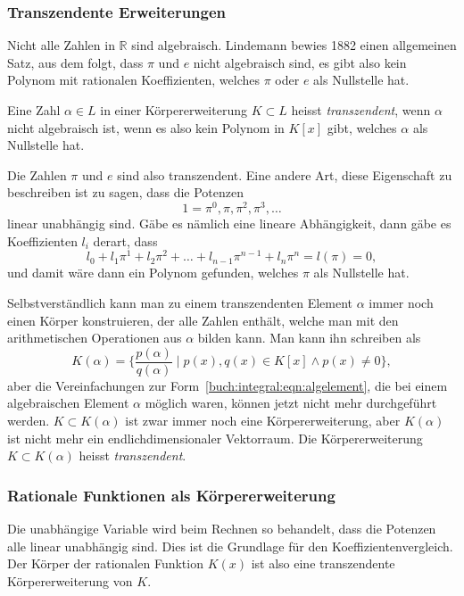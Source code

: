 %
%
\subsubsection{Transzendente Erweiterungen}
Nicht alle Zahlen in $\mathbb{R}$ sind algebraisch.
Lindemann bewies 1882 einen allgemeinen Satz, aus dem folgt,
%
dass $\pi$ und $e$ nicht algebraisch sind, es gibt also
kein Polynom mit rationalen Koeffizienten, welches $\pi$
oder $e$ als Nullstelle hat.
%
%

\begin{definition}
Eine Zahl $\alpha\in L$ in einer Körpererweiterung $K\subset L$ 
heisst {\em transzendent}, wenn $\alpha$ nicht algebraisch ist,
%
wenn es also kein Polynom in $K[x]$ gibt, welches $\alpha$ als
Nullstelle hat.
\end{definition}

Die Zahlen $\pi$ und $e$ sind also transzendent.
Eine andere Art, diese Eigenschaft zu beschreiben ist zu sagen,
dass die Potenzen
\[
1=\pi^0, \pi, \pi^2,\pi^3,\dots
\]
linear unabhängig sind.
Gäbe es nämlich eine lineare Abhängigkeit, dann gäbe es Koeffizienten
$l_i$ derart, dass
\[
l_0 + l_1\pi^1 + l_2\pi^2 + \ldots + l_{n-1}\pi^{n-1} + l_{n}\pi^n = l(\pi)=0,
\]
und damit wäre dann ein Polynom gefunden, welches $\pi$ als Nullstelle hat.

Selbstverständlich kann man zu einem transzendenten Element $\alpha$
immer noch einen Körper konstruieren, der alle Zahlen enthält, welche man
mit den arithmetischen Operationen aus $\alpha$ bilden kann.
Man kann ihn schreiben als
\[
K(\alpha)
=
\biggl\{
\frac{p(\alpha)}{q(\alpha)}
\;\bigg|\;
p(x),q(x)\in K[x] \wedge p(x)\ne 0
\biggr\},
\]
aber die Vereinfachungen zur
Form~\eqref{buch:integral:eqn:algelement}, die bei einem algebraischen
Element $\alpha$ möglich waren, können jetzt nicht mehr durchgeführt
werden.
$K\subset K(\alpha)$ ist zwar immer noch eine Körpererweiterung, aber
$K(\alpha)$ ist nicht mehr ein endlichdimensionaler Vektorraum.
Die Körpererweiterung $K\subset K(\alpha)$ heisst {\em transzendent}.

%
%
\subsubsection{Rationale Funktionen als Körpererweiterung}
Die unabhängige Variable wird beim Rechnen so behandelt, dass die
Potenzen alle linear unabhängig sind.
Dies ist die Grundlage für den Koeffizientenvergleich.
Der Körper der rationalen Funktion $K(x)$
ist also eine transzendente Körpererweiterung von $K$.


